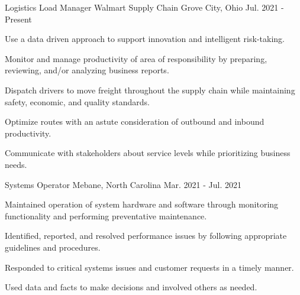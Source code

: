 


\begin{cventries}
	
	\cventry
	{Logistics Load Manager} %
	{Walmart Supply Chain} %
	{Grove City, Ohio} %
	{Jul. 2021 - Present} %
	{
		\begin{cvitems} %
			\item {Use a data driven approach to support innovation and intelligent risk-taking.}
			\item {Monitor and manage productivity of area of responsibility by 
				preparing, reviewing, and/or analyzing business reports.}
			\item {Dispatch drivers to move freight throughout the supply chain while
				maintaining safety, economic, and quality standards.}
			\item {Optimize routes with an astute consideration of outbound and inbound productivity.}
			\item {Communicate with stakeholders about service levels while prioritizing business needs.}
			\end{cvitems}
	}
	
	\cventry
	{Systems Operator} %
	{} %
	{Mebane, North Carolina} %
	{Mar. 2021 - Jul. 2021} %
	{
		\begin{cvitems} %
			\item {Maintained operation of system hardware and software through monitoring functionality and performing preventative maintenance.}
			\item {Identified, reported, and resolved performance issues by following appropriate guidelines and procedures.}
			\item {Responded to critical systems issues and customer requests in a timely manner.}
			\item{Used data and facts to make decisions and involved others as needed.}
		\end{cvitems}
	}
	

\end{cventries}

